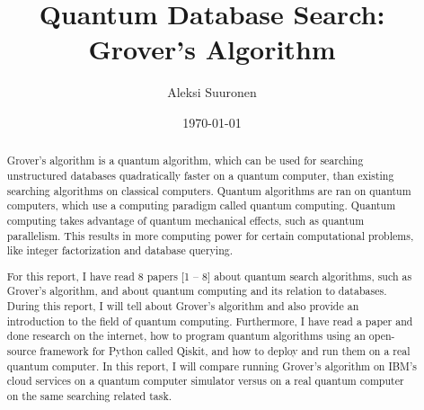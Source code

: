 \documentclass[english,oneside,openright]{UH_DS_report}
\title{Quantum Database Search: Grover's Algorithm}
\author{Aleksi Suuronen}
\date{\today}
\begin{document}
\maketitle


\begin{abstract} 

Grover's algorithm is a quantum algorithm, which can be used for searching unstructured databases quadratically faster on a quantum computer, than existing searching algorithms on classical computers. Quantum algorithms are ran on quantum computers, which use a computing paradigm called quantum computing. Quantum computing takes advantage of quantum mechanical effects, such as quantum parallelism. This results in more computing power for certain computational problems, like integer factorization and database querying.

For this report, I have read 8 papers [1 -- 8] about quantum search algorithms, such as Grover's algorithm, and about quantum computing and its relation to databases. During this report, I will tell about Grover's algorithm and also provide an introduction to the field of quantum computing. Furthermore, I have read a paper and done research on the internet, how to program quantum algorithms using an open-source framework for Python called Qiskit, and how to deploy and run them on a real quantum computer. In this report, I will compare running Grover's algorithm on IBM's cloud services on a quantum computer simulator versus on a real quantum computer on the same searching related task.

\end{abstract}

\mytableofcontents

\mynomenclature

\end{document}
